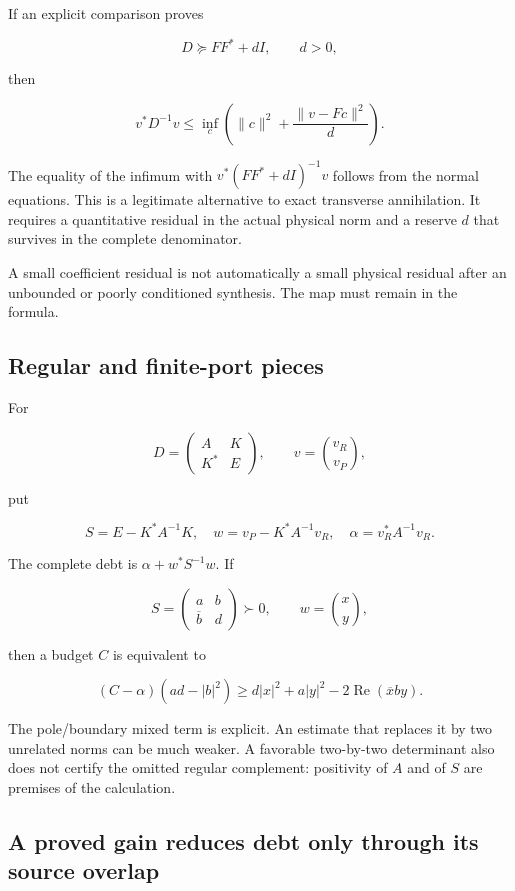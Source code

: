 \documentclass[
  10pt,
  a4paper,
  10pt,
  oneside,
  openany]{book}
\begin{document}
If an explicit comparison proves

\[
D\succeq FF^*+dI,\qquad d>0,
\tag{10.2}\label{eq:10.2}
\]

then

\[
v^*D^{-1}v
\le\inf_c\left(\|c\|^2+\frac{\|v-Fc\|^2}{d}\right).
\tag{10.3}\label{eq:10.3}
\]

The equality of the infimum with \(v^*(FF^*+dI)^{-1}v\) follows from the
normal equations. This is a legitimate alternative to exact transverse
annihilation. It requires a quantitative residual in the actual physical
norm and a reserve \(d\) that survives in the complete denominator.

A small coefficient residual is not automatically a small physical
residual after an unbounded or poorly conditioned synthesis. The map
must remain in the formula.

\subsection{Regular and finite-port
pieces}\label{regular-and-finite-port-pieces}

For

\[
D=\begin{pmatrix}A&K\\K^*&E\end{pmatrix},
\qquad v=\binom{v_R}{v_P},
\tag{10.4}\label{eq:10.4}
\]

put

\[
S=E-K^*A^{-1}K,
\quad w=v_P-K^*A^{-1}v_R,
\quad \alpha=v_R^*A^{-1}v_R.
\tag{10.5}\label{eq:10.5}
\]

The complete debt is \(\alpha+w^*S^{-1}w\). If

\[
S=\begin{pmatrix}a&b\\\overline b&d\end{pmatrix}\succ0,
\qquad w=\binom xy,
\tag{10.6}\label{eq:10.6}
\]

then a budget \(C\) is equivalent to

\[
(C-\alpha)(ad-|b|^2)
\ge d|x|^2+a|y|^2-2\operatorname{Re}(\overline xby).
\tag{10.7}\label{eq:10.7}
\]

The pole/boundary mixed term is explicit. An estimate that replaces it
by two unrelated norms can be much weaker. A favorable two-by-two
determinant also does not certify the omitted regular complement:
positivity of \(A\) and of \(S\) are premises of the calculation.

\subsection{A proved gain reduces debt only through its source
overlap}\label{a-proved-gain-reduces-debt-only-through-its-source-overlap}
\end{document}
